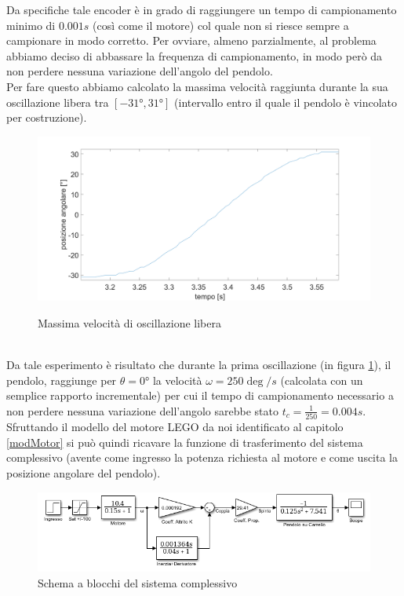 Da specifiche tale encoder è in grado di raggiungere un tempo di campionamento minimo di $0.001s$ (così come il motore) col quale non si riesce sempre a campionare in modo corretto. Per ovviare, almeno parzialmente, al problema abbiamo deciso di abbassare la frequenza di campionamento, in modo però da non perdere nessuna variazione dell'angolo del pendolo.\\
Per fare questo abbiamo calcolato la massima velocità raggiunta durante la sua oscillazione libera tra $[\ang{-31},\ang{+31}]$ (intervallo entro il quale il pendolo è vincolato per costruzione).
\begin{figure}[ht]
	\centering
	\includegraphics[width=\textwidth]{SlewRate.PNG}\\
	\caption{Massima velocità di oscillazione libera}
	\label{slewRate}
\end{figure}
\\Da tale esperimento è risultato che durante la prima oscillazione (in figura \ref{slewRate}), il pendolo, raggiunge per $\theta=\ang{0}$ la velocità $\omega=250\deg/s$ (calcolata con un semplice rapporto incrementale) per cui il tempo di campionamento necessario a non perdere nessuna variazione dell'angolo sarebbe stato $t_c=\displaystyle\frac{1}{250}=0.004s$.\\

Sfruttando il modello del motore LEGO da noi identificato al capitolo \ref{modMotor} si può quindi ricavare la funzione di trasferimento del sistema complessivo (avente come ingresso la potenza richiesta al motore e come uscita la posizione angolare del pendolo).\begin{figure}[ht]
	\centering
	\includegraphics[width=\textwidth]{SisComplessivoPendoloNormale.PNG}
	\caption{Schema a blocchi del sistema complessivo}
	\label{SisComplessivoPendoloNormale}
\end{figure}


